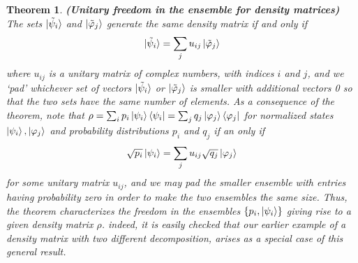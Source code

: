 \documentclass[12pt, oneside]{book}
\newtheorem{theorem}{Theorem}[section]
\theoremstyle{definition}
\theoremstyle{definition}
\theoremstyle{remark}
\begin{document}
\begin{theorem}
    \textbf{(Unitary freedom in the ensemble for density matrices)} The sets $\ket{\tilde{\psi}_i}$ and $\ket{\tilde{\varphi}_j}$ generate the same density matrix if and only if
    \[
    \ket{\tilde{\psi}_i}=\sum_j u_{ij}\ket{\tilde{\varphi}_j}
    \]
    where $u_{ij}$ is a unitary matrix of complex numbers, with indices $i$ and $j$, and we `pad' whichever set of vectors $\ket{\tilde{\psi}_i}$ or $\ket{\tilde{\varphi}_j}$ is smaller with additional vectors 0 so that the two sets have the same number of elements. As a consequence of the theorem, note that $\rho = \sum_i p_i\ket{\psi_i}\bra{\psi_i}=\sum_jq_j\ket{\varphi_j}\bra{\varphi_j}$ for normalized states $\ket{\psi_i},\ket{\varphi_j}$ and probability distributions $p_i$ and $q_j$ if an only if
    \[
    \sqrt{p_i}\ket{\psi_i}=\sum_ju_{ij}\sqrt{q_j}\ket{\varphi_j}
    \]
    for some unitary matrix $u_{ij}$, and we may pad the smaller ensemble with entries having probability zero in order to make the two ensembles the same size. Thus, the theorem characterizes the freedom in the ensembles $\{p_i,\ket{\psi_i}\}$ giving rise to a given density matrix $\rho$. indeed, it is easily checked that our earlier example of a density matrix with two different decomposition, arises as a special case of this general result. 
\end{theorem}
\end{document}
